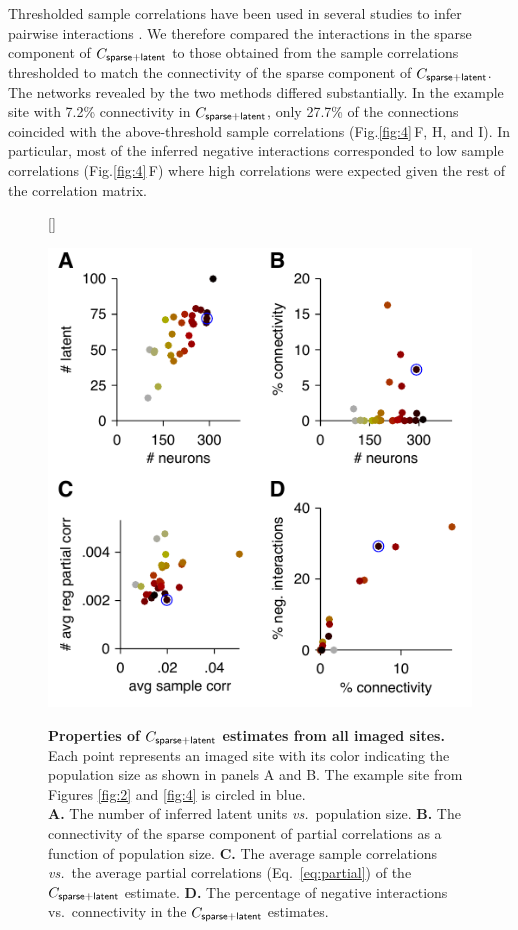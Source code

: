 \documentclass[10pt]{article}
\newcommand{\figref}[2]{Fig.\;\ref{fig:#1}\,#2}
\begin{document}
Thresholded sample correlations have been used in several studies to infer pairwise interactions \cite{Golshani:2009, Feldt:2011, Malmersjo:2013, Sadovsky:2014}.  We therefore compared the interactions in the sparse component of $C_{\sf sparse+latent}$ to those obtained from the sample correlations thresholded to match the connectivity of the sparse component of $C_{\sf sparse+latent}$.  The networks revealed by the two methods differed substantially. In the example site with 7.2\% connectivity in $C_{\sf sparse+latent}$, only 27.7\% of the connections coincided with the above-threshold sample correlations (\figref{4}{F, H, and I}). In particular, most of the inferred negative interactions corresponded to low sample correlations (\figref{4}{F}) where high correlations were expected given the rest of the correlation matrix.


\begin{figure}    [\FBwidth]
    {\caption{{\bf Properties of $C_{\sf sparse+latent}$ estimates from all imaged sites.} 
    Each point represents an imaged site with its color indicating the population size as shown in panels A and B. The example site from Figures \ref{fig:2} and \ref{fig:4} is circled in blue. 
\\
    {\bf A.} The number of inferred latent units \emph{vs.}~population size.
    {\bf B.} The connectivity of the sparse component of partial correlations as a function of population size.
    {\bf C.} The average sample correlations \emph{vs.}~the average partial correlations (Eq.~\ref{eq:partial}) of the $C_{\sf sparse+latent}$ estimate.
    {\bf D.} The percentage of negative interactions vs.~connectivity in the $C_{\sf sparse+latent}$ estimates.
}
\label{fig:5}}
{\includegraphics{./figures/Figure05.pdf}}
\end{figure}
\end{document}
